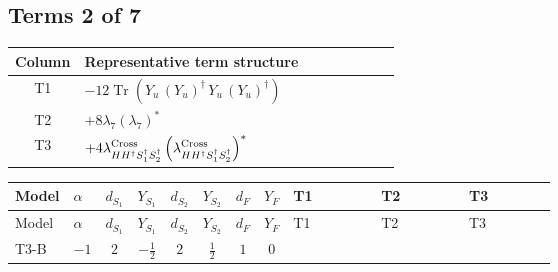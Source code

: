 \documentclass[8pt]{article}
\begin{document}
\begin{landscape}
\subsection*{Terms 2 of 7}
\begin{center}
\begin{tabular}{@{}c >{\raggedright\arraybackslash}p{0.82\linewidth}@{}}
\toprule
Column & Representative term structure \\
\midrule
T1 & \(\displaystyle -12 \operatorname{Tr}\!\left({Y_u}\,\left({Y_u}\right)^{\dagger}\,{Y_u}\,\left({Y_u}\right)^{\dagger}\right)\) \\
\midrule
T2 & \(\displaystyle +8 {\lambda_{7}} \left({\lambda_{7}}\right)^{*}\) \\
\midrule
T3 & \(\displaystyle +4 {\lambda_{H H^\dagger S_1^\dagger S_2^\dagger}^{\rm Cross}} \left({\lambda_{H H^\dagger S_1^\dagger S_2^\dagger}^{\rm Cross}}\right)^{*}\) \\
\midrule
\bottomrule
\end{tabular}
\end{center}
\smallskip
\tiny
\begin{longtable}{@{}llcccccc >{\raggedright\arraybackslash}p{0.21\linewidth} >{\raggedright\arraybackslash}p{0.21\linewidth} >{\raggedright\arraybackslash}p{0.21\linewidth}@{}}
\toprule
Model & $\alpha$ & $d_{S_1}$ & $Y_{S_1}$ & $d_{S_2}$ & $Y_{S_2}$ & $d_F$ & $Y_F$ & T1 & T2 & T3 \\
\midrule
\endfirsthead
\toprule
Model & $\alpha$ & $d_{S_1}$ & $Y_{S_1}$ & $d_{S_2}$ & $Y_{S_2}$ & $d_F$ & $Y_F$ & T1 & T2 & T3 \\
\midrule
\endhead
T3-B & $-1$ & $2$ & $-\frac{1}{2}$ & $2$ & $\frac{1}{2}$ & $1$ & $0$ & \scriptsize\adjustbox{max width=\linewidth}{$\begin{gathered} -12 \operatorname{Tr}\!\left({Y_u}\,\left({Y_u}\right)^{\dagger}\,{Y_u}\,\left({Y_u}\right)^{\dagger}\right)\end{gathered}$} & \scriptsize\adjustbox{max width=\linewidth}{$\begin{gathered} +8 {\lambda_{7}} \left({\lambda_{7}}\right)^{*}\end{gathered}$} & \scriptsize\adjustbox{max width=\linewidth}{$\begin{gathered} +4 {\lambda_{H H^\dagger S_1^\dagger S_2^\dagger}^{\rm Cross}} \left({\lambda_{H H^\dagger S_1^\dagger S_2^\dagger}^{\rm Cross}}\right)^{*}\end{gathered}$} \\
\midrule

\end{longtable}
\end{landscape}
\end{document}
